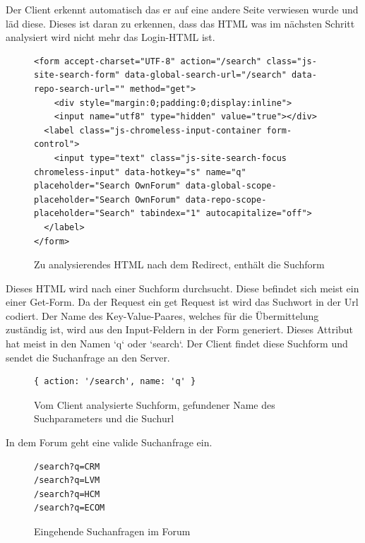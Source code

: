 Der Client erkennt automatisch das er auf eine andere Seite verwiesen wurde und läd diese. Dieses ist daran zu erkennen, dass das HTML was im nächsten Schritt analysiert wird nicht mehr das Login-HTML ist.

\begin{figure}[h!]
\begin{lstlisting}[language=HTML5]
<form accept-charset="UTF-8" action="/search" class="js-site-search-form" data-global-search-url="/search" data-repo-search-url="" method="get">
	<div style="margin:0;padding:0;display:inline">
	<input name="utf8" type="hidden" value="true"></div>
  <label class="js-chromeless-input-container form-control">
    <input type="text" class="js-site-search-focus  chromeless-input" data-hotkey="s" name="q" placeholder="Search OwnForum" data-global-scope-placeholder="Search OwnForum" data-repo-scope-placeholder="Search" tabindex="1" autocapitalize="off">
  </label>
</form>
\end{lstlisting}
\caption{Zu analysierendes HTML nach dem Redirect, enthält die Suchform}
\end{figure}

Dieses HTML wird nach einer Suchform durchsucht. Diese befindet sich meist ein einer Get-Form. Da der Request ein get Request ist wird das Suchwort in der Url codiert. Der Name des Key-Value-Paares, welches für die Übermittelung zuständig ist, wird aus den Input-Feldern in der Form generiert. Dieses Attribut hat meist in den Namen `q` oder `search`. Der Client findet diese Suchform und sendet die Suchanfrage an den Server.


\begin{figure}[ht]
\begin{lstlisting}[language=HTML5]
{ action: '/search', name: 'q' }
\end{lstlisting}
\caption{Vom Client analysierte Suchform, gefundener Name des Suchparameters und die Suchurl}
\end{figure}

In dem Forum geht eine valide Suchanfrage ein.


\begin{figure}[ht]
\begin{lstlisting}[language=HTML5]
/search?q=CRM
/search?q=LVM
/search?q=HCM
/search?q=ECOM
\end{lstlisting}
\caption{Eingehende Suchanfragen im Forum }
\end{figure}

